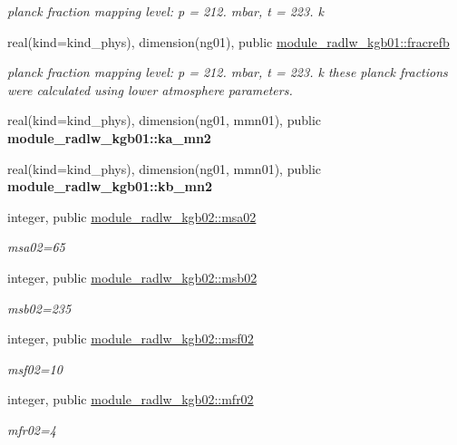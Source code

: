 \begin{DoxyCompactItemize}
\begin{DoxyCompactList}\small\item\em planck fraction mapping level\+: p = 212. mbar, t = 223. k \end{DoxyCompactList}\item 
real(kind=kind\+\_\+phys), dimension(ng01), public \hyperlink{group__module__radlw__kgbnn_ga19b6a3893965817e82c77bee1de536cd}{module\+\_\+radlw\+\_\+kgb01\+::fracrefb}
\begin{DoxyCompactList}\small\item\em planck fraction mapping level\+: p = 212. mbar, t = 223. k these planck fractions were calculated using lower atmosphere parameters. \end{DoxyCompactList}\item 
real(kind=kind\+\_\+phys), dimension(ng01, mmn01), public {\bfseries module\+\_\+radlw\+\_\+kgb01\+::ka\+\_\+mn2}
\item 
real(kind=kind\+\_\+phys), dimension(ng01, mmn01), public {\bfseries module\+\_\+radlw\+\_\+kgb01\+::kb\+\_\+mn2}
\item 
\mbox{\label{namespacemodule__radlw__kgb02_a370b514d7834ac2a22d245f118882bf4}} 
integer, public \hyperlink{namespacemodule__radlw__kgb02_a370b514d7834ac2a22d245f118882bf4}{module\+\_\+radlw\+\_\+kgb02\+::msa02}
\begin{DoxyCompactList}\small\item\em msa02=65 \end{DoxyCompactList}\item 
integer, public \hyperlink{group__module__radlw__kgbnn_ga03e70b84fd16795104a3fb7b425af70c}{module\+\_\+radlw\+\_\+kgb02\+::msb02}
\begin{DoxyCompactList}\small\item\em msb02=235 \end{DoxyCompactList}\item 
integer, public \hyperlink{group__module__radlw__kgbnn_ga99b728d38d664afc203303563541ab5c}{module\+\_\+radlw\+\_\+kgb02\+::msf02}
\begin{DoxyCompactList}\small\item\em msf02=10 \end{DoxyCompactList}\item 
integer, public \hyperlink{group__module__radlw__kgbnn_ga2973c2e9220e85b74f0b251c896aa837}{module\+\_\+radlw\+\_\+kgb02\+::mfr02}
\begin{DoxyCompactList}\small\item\em mfr02=4 \end{DoxyCompactList}\item 

\end{DoxyCompactItemize}
